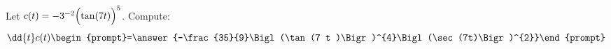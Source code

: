 \documentclass{ximera}
\author{Bart Snapp\and Nela Lakos}
\begin{document}
\begin{exercise}
Let $c(t) = -3^{-2} \Bigl(\tan (7 t )\Bigr)^5$. Compute:
\[
\dd{t}c(t)
\begin{prompt}=\answer{-\frac{35}{9}\Bigl(\tan (7 t )\Bigr)^{4}\Bigl(\sec(7t)\Bigr)^{2}}\end{prompt}
\]
\end{exercise}
\end{document}
